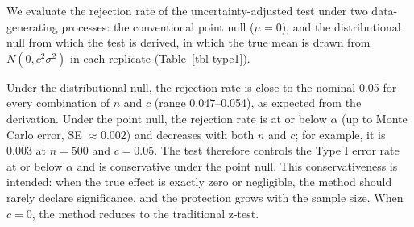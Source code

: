 \documentclass[
  11pt,
  letterpaper,
]{article}
\begin{document}
We evaluate the rejection rate of the uncertainty-adjusted test under
two data-generating processes: the conventional point null
(\(\mu = 0\)), and the distributional null from which the test is
derived, in which the true mean is drawn from \(N(0, c^2\sigma^2)\) in
each replicate (Table~\ref{tbl-type1}).

\begin{table}

\caption{\label{tbl-type1}Rejection rates of the uncertainty-adjusted
test at \(\alpha = 0.05\) under the point null and the distributional
null (10,000 simulations per scenario)}


\end{table}%

Under the distributional null, the rejection rate is close to the
nominal 0.05 for every combination of \(n\) and \(c\) (range
0.047--0.054), as expected from the derivation. Under the point null,
the rejection rate is at or below \(\alpha\) (up to Monte Carlo error,
SE \(\approx 0.002\)) and decreases with both \(n\) and \(c\); for
example, it is 0.003 at \(n = 500\) and \(c = 0.05\). The test therefore
controls the Type I error rate at or below \(\alpha\) and is
conservative under the point null. This conservativeness is intended:
when the true effect is exactly zero or negligible, the method should
rarely declare significance, and the protection grows with the sample
size. When \(c = 0\), the method reduces to the traditional z-test.
\end{document}

